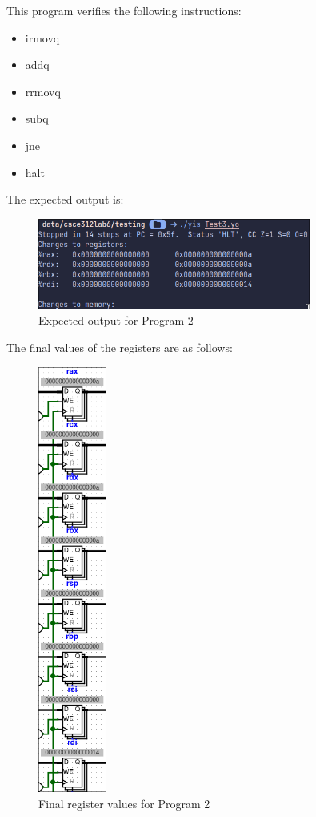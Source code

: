 \documentclass{article}
\begin{document}
This program verifies the following instructions:
\begin{itemize}
    \item irmovq
    \item addq
    \item rrmovq
    \item subq
    \item jne
    \item halt
\end{itemize}

The expected output is:

\begin{figure}[H]
    \centering
    \includegraphics[width=0.8\textwidth]{./images/test3_out.png}
    \caption{Expected output for Program 2}
\end{figure}

The final values of the registers are as follows:

\begin{figure}
    \centering
    \includegraphics[width=0.2\textwidth]{./images/test3_reg.png}
    \caption{Final register values for Program 2}
\end{figure}
\end{document}
